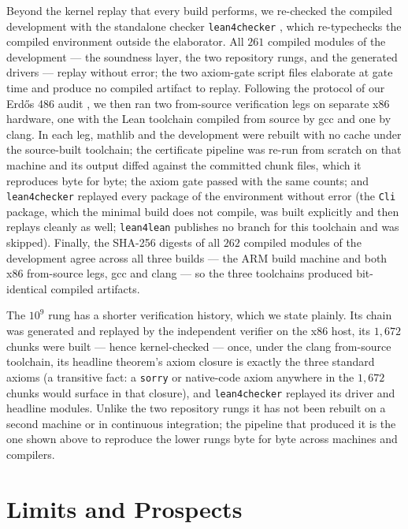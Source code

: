 \documentclass[11pt]{article}
\newcommand{\lean}[1]{\texttt{#1}}
\begin{document}
Beyond the kernel replay that every build performs, we re-checked the
compiled development with the standalone checker \lean{lean4checker}
\cite{lean4checker}, which re-typechecks the compiled environment
outside the elaborator. All $261$ compiled modules of the development
--- the soundness layer, the two repository rungs, and the generated
drivers --- replay without error; the two axiom-gate script files
elaborate at gate time and produce no compiled artifact to replay.
Following the protocol of our Erd\H{o}s 486 audit \cite{pilus}, we then
ran two from-source verification legs on separate x86 hardware, one
with the Lean toolchain compiled from source by gcc and one by clang.
In each leg, mathlib and the development were rebuilt with no cache
under the source-built toolchain; the certificate pipeline was re-run
from scratch on that machine and its output diffed against the
committed chunk files, which it reproduces byte for byte; the axiom
gate passed with the same counts; and \lean{lean4checker} replayed
every package of the environment without error (the \lean{Cli} package,
which the minimal build does not compile, was built explicitly and then
replays cleanly as well; \lean{lean4lean} publishes no branch for this
toolchain and was skipped). Finally, the SHA-256 digests of all $262$
compiled modules of the development agree across all three builds ---
the ARM build machine and both x86 from-source legs, gcc and clang ---
so the three toolchains produced bit-identical compiled artifacts.

The $10^9$ rung has a shorter verification history, which we state
plainly. Its chain was generated and replayed by the independent
verifier on the x86 host, its $1{,}672$ chunks were built --- hence
kernel-checked --- once, under the clang from-source toolchain, its
headline theorem's axiom closure is exactly the three standard axioms
(a transitive fact: a \lean{sorry} or native-code axiom anywhere in the
$1{,}672$ chunks would surface in that closure), and \lean{lean4checker}
replayed its driver and headline modules. Unlike the two repository
rungs it has not been rebuilt on a second machine or in continuous
integration; the pipeline that produced it is the one shown above to
reproduce the lower rungs byte for byte across machines and compilers.

\section{Limits and Prospects}\label{sec:limits}
\end{document}
